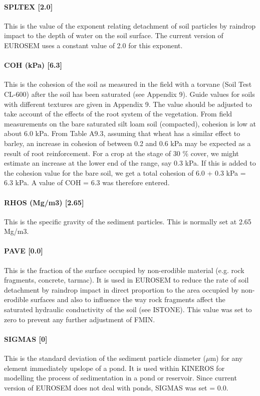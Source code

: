 \paragraph{SPLTEX [2.0]}
This is the value of the exponent relating detachment of soil particles by
raindrop impact to the depth of water on the soil surface. The current version
of EUROSEM uses a constant value of 2.0 for this exponent.
 
\paragraph{COH (kPa) [6.3]}
This is the cohesion of the soil as measured in the field with a torvane (Soil
Test CL-600) after the soil has been saturated (see Appendix 9). Guide values
for soils with different textures are given in Appendix 9. The value should be
adjusted to take account of the effects of the root system of the vegetation.
From field measurements on the bare saturated silt loam soil (compacted),
cohesion is low at about 6.0 kPa. From Table A9.3, assuming that wheat has a
similar effect to barley, an increase in cohesion of between 0.2 and 0.6 kPa may
be expected as a result of root reinforcement. For a crop at the stage of 30 \%
cover, we might estimate an increase at the lower end of the range, say 0.3 kPa.
If this is added to the cohesion value for the bare soil, we get a total
cohesion of 6.0 + 0.3 kPa = 6.3 kPa. A value of COH = 6.3 was therefore entered.
 
\paragraph{RHOS (Mg/m3) [2.65]}
This is the specific gravity of the sediment particles. This is normally set at
2.65 Mg/m3.
 
\paragraph{PAVE [0.0]}
This is the fraction of the surface occupied by non-erodible material (e.g.
rock fragments, concrete, tarmac). It is used in EUROSEM to reduce the rate of
soil detachment by raindrop impact in direct proportion to the area occupied by
non-erodible surfaces and also to influence the way rock fragments affect the
saturated hydraulic conductivity of the soil (see ISTONE). This value was set to
zero to prevent any further adjustment of FMIN.
 
\paragraph{SIGMAS [0]}
This is the standard deviation of the sediment particle diameter ($\mu$m) for
any element immediately upslope of a pond. It is used within KINEROS for
modelling the process of sedimentation in a pond or reservoir. Since current
version of EUROSEM does not deal with ponds, SIGMAS was set = 0.0.
 
